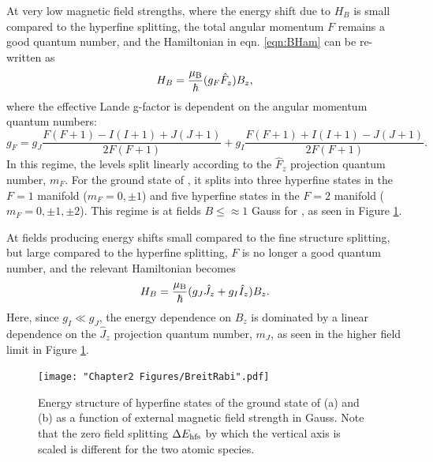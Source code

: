 At very low magnetic field strengths, where the energy shift due to $H_B$ is small compared to the hyperfine splitting, the total angular momentum $F$ remains a good quantum number, and the Hamiltonian in eqn. \ref{eqn:BHam} can be re-written as
\begin{equation}
H_B = \frac{\mu_{\rm B}}{\hbar}(g_F \hat{F}_z) B_z,
\label{eqn:BHam}
\end{equation}
where the effective Lande g-factor is dependent on the angular momentum quantum numbers:
\begin{equation}
g_F = g_J\frac{F(F+1)-I(I+1)+J(J+1)}{2F(F+1)} + g_I\frac{F(F+1)+I(I+1)-J(J+1)}{2F(F+1)}.
\end{equation}
In this regime, the levels split linearly according to the $\hat{F}_z$ projection quantum number, $m_F$. For the ground state of \Rb{}, it splits into three hyperfine states in the $F=1$ manifold ($m_F=0,\pm1$) and five hyperfine states in the $F=2$ manifold ($m_F=0,\pm1,\pm2$). This regime is at fields $B\leq\approx1$ Gauss for \Rb{}, as seen in Figure \ref{fig:hyperfineSteck}. 

At fields producing energy shifts small compared to the fine structure splitting, but large compared to the hyperfine splitting, $F$ is no longer a good quantum number, and the relevant Hamiltonian becomes
\begin{equation}
H_B = \frac{\mu_{\rm B}}{\hbar}(g_J \hat{J}_z+g_I \hat{I}_z) B_z.
\end{equation}
Here, since $g_I \ll g_J$, the energy dependence on $B_z$ is dominated by a linear dependence on the $\hat{J}_z$ projection quantum number, $m_J$, as seen in the higher field limit in Figure \ref{fig:hyperfineSteck}. 

\begin{figure}
	\texttt{[image: "Chapter2 Figures/BreitRabi".pdf]}
\caption[Energy structure of hyperfine states of \Rb{} and \K{}]{Energy structure of hyperfine states of the ground state of (a) \Rb{} and (b)\K{} as a function of external magnetic field strength in Gauss. Note that the zero field splitting $\Delta E_{\rm hfs}$ by which the vertical axis is scaled is different for the two atomic species.}
\label{fig:hyperfineSteck}
\end{figure}

